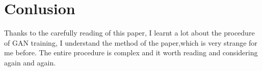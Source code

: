 \documentclass[10pt,twocolumn,letterpaper]{article}
\begin{document}
\section{Conlusion}
Thanks to the carefully reading of this paper, I learnt a lot about the procedure of GAN training, I understand the method of the paper,which is very strange for me before. The entire procedure is complex and it worth reading and considering again and again.

{\small


}
\end{document}
